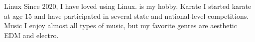 



\begin{cvskills}
\cvskill
    {Linux} %
    {Since 2020, I have loved using Linux.  is my hobby.} %
\cvskill
    {Karate} %
    {I started karate at age 15 and have participated in several state and national-level competitions.} %
\cvskill
    {Music} %
    {I enjoy almost all types of music, but my favorite genres are aesthetic EDM and electro.} %

\end{cvskills}